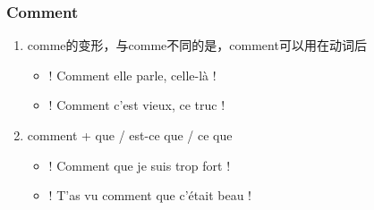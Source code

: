 \documentclass[UTF8]{report}
\begin{document}
\subsubsection{Comment}
\begin{enumerate}
    \item comme的变形，与comme不同的是，comment可以用在动词后
    \begin{itemize}
        \item ! Comment elle parle, celle-là !
        \item ! Comment c’est vieux, ce truc !
    \end{itemize}
    \item comment + que / est-ce que / ce que
    \begin{itemize}
        \item ! Comment que je suis trop fort !
        \item ! T’as vu comment que c’était beau !
    \end{itemize}
\end{enumerate}
\end{document}
